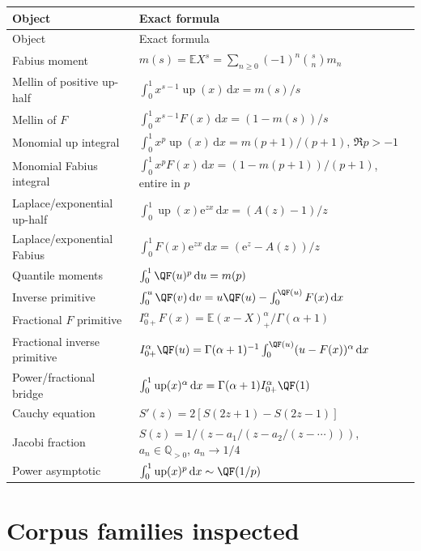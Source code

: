 \documentclass[11pt,oneside]{article}
\theoremstyle{definition}
\theoremstyle{remark}
\newcommand{\Up}{\operatorname{up}}
\newcommand{\E}{\mathbb E}
\newcommand{\dd}{\,\mathrm d}
\newcommand{\e}{\mathrm e}
\newcommand{\1}{\mathbf 1}
\begin{document}
\begin{longtable}{@{}p{}p{}@{}}
\toprule
Object & Exact formula \\
\midrule
\endfirsthead
\toprule
Object & Exact formula \\
\midrule
\endhead
Fabius moment
& \(m(s)=\E X^s=\sum_{n\ge0}(-1)^n\binom{s}{n}m_n\) \\
Mellin of positive up-half
& \(\int_0^1x^{s-1}\Up(x)\dd x=m(s)/s\) \\
Mellin of \(F\)
& \(\int_0^1x^{s-1}F(x)\dd x=(1-m(s))/s\) \\
Monomial up integral
& \(\int_0^1x^p\Up(x)\dd x=m(p+1)/(p+1)\), \(\Re p>-1\) \\
Monomial Fabius integral
& \(\int_0^1x^pF(x)\dd x=(1-m(p+1))/(p+1)\), entire in \(p\) \\
Laplace/exponential up-half
& \(\int_0^1\Up(x)\e^{zx}\dd x=(A(z)-1)/z\) \\
Laplace/exponential Fabius
& \(\int_0^1F(x)\e^{zx}\dd x=(\e^z-A(z))/z\) \\
Quantile moments
& \(\int_0^1\QF(u)^p\dd u=m(p)\) \\
Inverse primitive
& \(\int_0^u\QF(v)\dd v=u\QF(u)-\int_0^{\QF(u)}F(x)\dd x\) \\
Fractional \(F\) primitive
& \(I_{0+}^{\alpha}F(x)=\E(x-X)_+^\alpha/\Gamma(\alpha+1)\) \\
Fractional inverse primitive
& \(I_{0+}^{\alpha}\QF(u)=\Gamma(\alpha+1)^{-1}\int_0^{\QF(u)}(u-F(x))^\alpha\dd x\) \\
Power/fractional bridge
& \(\int_0^1\Up(x)^\alpha\dd x=\Gamma(\alpha+1)I_{0+}^{\alpha}\QF(1)\) \\
Cauchy equation
& \(S'(z)=2[S(2z+1)-S(2z-1)]\) \\
Jacobi fraction
& \(S(z)=1/(z-a_1/(z-a_2/(z-\cdots)))\), \(a_n\in\mathbb Q_{>0}\), \(a_n\to1/4\) \\
Power asymptotic
& \(\int_0^1\Up(x)^p\dd x\sim\QF(1/p)\) \\
\bottomrule
\end{longtable}

\section{Corpus families inspected}
\label{p8:app:corpus}
\end{document}

